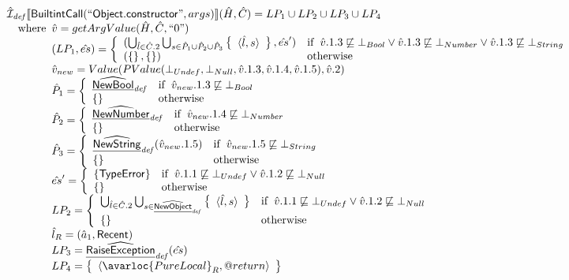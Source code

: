 \[\begin{array}{l}
\end{array}
\]\[
\begin{array}{l}
\aI_{\it def}\lbr \SF{BuiltintCall}(``\SF{Object.constructor}",args)\rbr(\hat{H},\hat{C}) = LP_1 \cup LP_2 \cup LP_3 \cup LP_4\\
\quad\wherec{
  \hat{v} = getArgValue(\hat{H}, \hat{C}, ``0")\\
  (LP_1, \hat{es}) = \left\{\begin{array}{ll}
      (\bigcup_{\hat{l} \in \hat{C}.2} \bigcup_{s \in \hat{P}_1\cup \hat{P}_2 \cup \hat{P}_3} \set{\langle \hat{l}, s \rangle}, \hat{es}')
      & \ifc{\hat{v}.1.3 \not\sqsubseteq \bot_{Bool} \lor \hat{v}.1.3 \not\sqsubseteq \bot_{Number} \lor \hat{v}.1.3 \not\sqsubseteq \bot_{String}}\\
      (\set{}, \set{}) & \owc
    \end{array}\right.\\
  \hat{v}_{new} = Value(PValue(\bot_{Undef}, \bot_{Null}, \hat{v}.1.3, \hat{v}.1.4, \hat{v}.1.5), \hat{v}.2)\\
  \hat{P}_1 = \left\{\begin{array}{ll}
      \ahf{NewBool}_{\it def}
      & \ifc{\hat{v}_{new}.1.3 \not\sqsubseteq \bot_{Bool}}\\
      \set{} & \owc
    \end{array}\right.\\
  \hat{P}_2 = \left\{\begin{array}{ll}
      \ahf{NewNumber}_{\it def}
      & \ifc{\hat{v}_{new}.1.4 \not\sqsubseteq \bot_{Number}}\\
      \set{} & \owc
    \end{array}\right.\\
  \hat{P}_3 = \left\{\begin{array}{ll}
      \ahf{NewString}_{\it def}(\hat{v}_{new}.1.5)
      & \ifc{\hat{v}_{new}.1.5 \not\sqsubseteq \bot_{String}}\\
      \set{} & \owc
    \end{array}\right.\\
  \hat{es}' = \left\{\begin{array}{ll}
      \{ \SF{TypeError} \}
      & \ifc{\hat{v}.1.1 \not\sqsubseteq \bot_{Undef} \lor \hat{v}.1.2 \not\sqsubseteq \bot_{Null}}\\
      \set{} & \owc
    \end{array}\right.\\
  LP_2 = \left\{\begin{array}{ll}
      \bigcup_{\hat{l} \in \hat{C}.2} \bigcup_{s \in \ahf{NewObject}_{\it def}} \set{\langle \hat{l}, s \rangle}
      & \ifc{\hat{v}.1.1 \not\sqsubseteq \bot_{Undef} \lor \hat{v}.1.2 \not\sqsubseteq \bot_{Null}}\\
      \set{} & \owc
    \end{array}\right.\\
  \hat{l}_R = (\hat{a}_1, \SF{Recent})\\
  LP_3 = \ahf{RaiseException}_{\it def}(\hat{es})\\
  LP_4 = \set{\langle\avarloc{PureLocal}_R,\varprop{return}\rangle}\\
  }\\
\\


\end{array}\]
